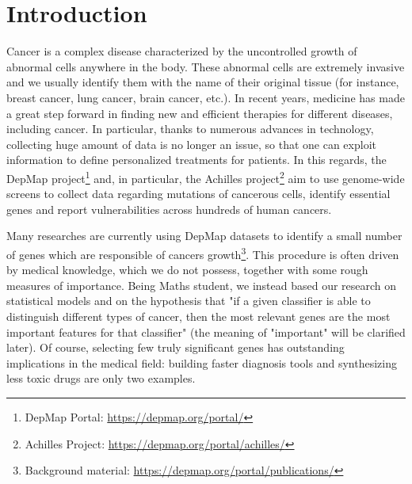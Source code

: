 \documentclass[a4paper,11pt, oneside]{article}  %
\begin{document}
	
	\section{Introduction}
	Cancer is a complex disease characterized by the uncontrolled growth of abnormal cells anywhere in the body. These abnormal cells are extremely invasive and we usually identify them with the name of their original tissue (for instance, breast cancer, lung cancer,  brain cancer, etc.).  In recent years, medicine has made a great step forward in finding new and efficient therapies for different diseases, including cancer.  In particular,  thanks to numerous advances in technology,  collecting huge amount of data is no longer an issue, so that one can exploit information to define personalized treatments for patients. In this regards, the DepMap project\footnote{DepMap Portal: \url{https://depmap.org/portal/} } and,  in particular,  the Achilles project\footnote{Achilles Project: \url{https://depmap.org/portal/achilles/} } aim to use genome-wide screens to collect data regarding mutations of cancerous cells,  identify essential genes and report vulnerabilities across hundreds of human cancers. 
	
	Many researches are currently using DepMap datasets to identify a small number of genes which are responsible of cancers growth\footnote{Background material: \url{https://depmap.org/portal/publications/}}. This procedure is often driven by medical knowledge,  which we do not possess,  together with some rough measures of importance.  Being Maths student, we instead based our research on statistical models and on the hypothesis that "if a given classifier is able to distinguish different types of cancer, then the most relevant genes are the most important features for that classifier" (the meaning of "important" will be clarified later).  Of course,  selecting few truly significant genes has outstanding implications in the medical field: building faster diagnosis tools and synthesizing less toxic drugs are only two examples. 
	
	
\end{document}
